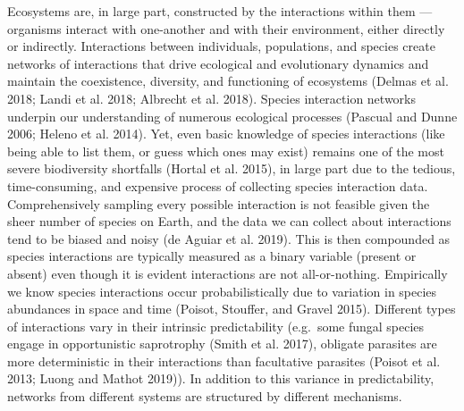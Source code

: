 \documentclass[10pt,oneside]{article}
\begin{document}
Ecosystems are, in large part, constructed by the interactions within
them --- organisms interact with one-another and with their environment,
either directly or indirectly. Interactions between individuals,
populations, and species create networks of interactions that drive
ecological and evolutionary dynamics and maintain the coexistence,
diversity, and functioning of ecosystems (Delmas et al. 2018; Landi et
al. 2018; Albrecht et al. 2018). Species interaction networks underpin
our understanding of numerous ecological processes (Pascual and Dunne
2006; Heleno et al. 2014). Yet, even basic knowledge of species
interactions (like being able to list them, or guess which ones may
exist) remains one of the most severe biodiversity shortfalls (Hortal et
al. 2015), in large part due to the tedious, time-consuming, and
expensive process of collecting species interaction data.
Comprehensively sampling every possible interaction is not feasible
given the sheer number of species on Earth, and the data we can collect
about interactions tend to be biased and noisy (de Aguiar et al. 2019).
This is then compounded as species interactions are typically measured
as a binary variable (present or absent) even though it is evident
interactions are not all-or-nothing. Empirically we know species
interactions occur probabilistically due to variation in species
abundances in space and time (Poisot, Stouffer, and Gravel 2015).
Different types of interactions vary in their intrinsic predictability
(e.g.~some fungal species engage in opportunistic saprotrophy (Smith et
al. 2017), obligate parasites are more deterministic in their
interactions than facultative parasites (Poisot et al. 2013; Luong and
Mathot 2019)). In addition to this variance in predictability, networks
from different systems are structured by different mechanisms.
\end{document}
